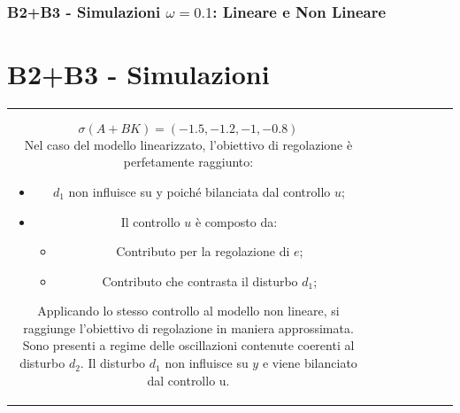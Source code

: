 \documentclass{beamer}
\begin{document}
\begin{frame}
	\frametitle{B2+B3 - Simulazioni \(\omega=0.1\): Lineare e Non Lineare}%
	\section{B2+B3 - Simulazioni}%
	\begin{tabular}{cc}
		\begin{minipage}{0.45\textwidth}
			\begin{equation*}
				\sigma (A+BK)=(-1.5,-1.2,-1,-0.8)
			\end{equation*}
			Nel caso del modello linearizzato, l'obiettivo di regolazione è perfetamente raggiunto:
			\begin{itemize}
				\item \(d_{1}\) non influisce su y poiché bilanciata dal controllo \(u\);
				\item Il controllo \(u\) è composto da:
				\begin{itemize}
					\item Contributo per la regolazione di \(e\);
					\item Contributo che contrasta il disturbo \(d_{1}\);
				\end{itemize}
			\end{itemize}
			Applicando lo stesso controllo al modello non lineare, si raggiunge l'obiettivo di regolazione in maniera approssimata. Sono presenti a regime delle oscillazioni contenute coerenti al disturbo \(d_{2}\).
			Il disturbo \(d_{1}\) non influisce su \(y\) e viene bilanciato dal controllo u.
		\end{minipage}
		&
		\begin{minipage}{0.45\textwidth}
			\begin{figure}

\end{figure}
\end{minipage}
\end{tabular}
\end{frame}
\end{document}

